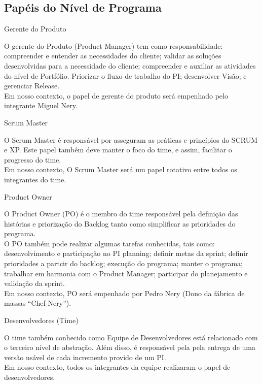 {\large{\subsection {Papéis do Nível de Programa\\} } }
\begin{itemize}

{
    \large{\item {Gerente do Produto} }

    \tab O gerente do Produto (Product Manager)  tem como responsabilidade: compreender e entender as necessidades do cliente; validar as soluções desenvolvidas para a necessidade do cliente;  compreender e auxiliar as atividades do nível de Portfólio. Priorizar o fluxo de trabalho do PI; desenvolver Visão; e gerenciar Release. \\
    \tab Em nosso contexto, o papel de gerente do produto será empenhado pelo integrante Miguel Nery. \\
 }

{
    \large{\item {Scrum Master\\} }
    \tab O Scrum Master é responsável por asseguram as práticas e princípios do SCRUM e XP. Este papel também deve manter o foco do time, e assim, facilitar o progresso do time. \\
    \tab Em nosso contexto, O Scrum Master será um papel rotativo entre todos os integrantes do time. \\
}


{
    \large{\item {Product Owner} }

    \tab O Product Owner (PO) é o membro do time responsável pela definição das histórias e priorização do Backlog tanto como simplificar as prioridades do programa. \\
    \tab O PO também pode realizar algumas tarefas conhecidas, tais como: desenvolvimento e participação no PI planning; definir metas da sprint; definir prioridades  a partcir do backlog; execução do programa; manter o programa; trabalhar em harmonia com o Product Manager; participar do planejamento e validação da sprint. \\
    \tab Em nosso contexto, PO será empenhado por Pedro Nery (Dono da fábrica de massas “Chef Nery”). \\
}

{
    \large{\item {Desenvolvedores (Time)} }

    \tab O time também conhecido como Equipe de Desenvolvedores está relacionado com o terceiro nível de abstração. Além disso, é responsável pela pela entrega de uma versão usável de cada incremento provido de um PI. \\
    \tab Em nosso contexto, todos os integrantes da equipe realizaram o papel de desenvolvedores. \\

}

\end{itemize}
